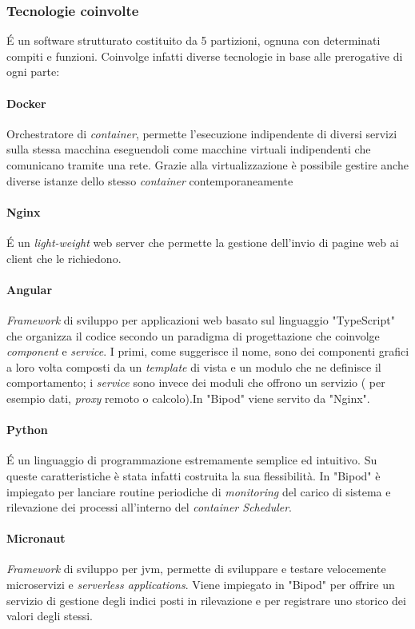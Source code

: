 \subsubsection{Tecnologie coinvolte}
\'E un software strutturato costituito da 5 partizioni, ognuna con determinati compiti e funzioni. Coinvolge infatti diverse tecnologie in base alle prerogative di ogni parte:

\paragraph{Docker} Orchestratore di \textit{container}, permette l'esecuzione indipendente di diversi servizi sulla stessa macchina eseguendoli come macchine virtuali indipendenti che comunicano tramite una rete. Grazie alla virtualizzazione è possibile gestire anche diverse istanze dello stesso \textit{container} contemporaneamente

\paragraph{Nginx} \'E un \textit{light-weight} web server che permette la gestione dell'invio di pagine web ai client che le richiedono.

\paragraph{Angular} \textit{Framework} di sviluppo per applicazioni web basato sul linguaggio "TypeScript" che organizza il codice secondo un paradigma di progettazione che coinvolge \textit{component} e \textit{service}. I primi, come suggerisce il nome, sono dei componenti grafici a loro volta composti da un \textit{template} di vista e un modulo che ne definisce il comportamento; i \textit{service} sono invece dei moduli che offrono un servizio ( per esempio dati, \textit{proxy} remoto o calcolo).In "Bipod" viene servito da "Nginx".

\paragraph{Python} \'E un linguaggio di programmazione estremamente semplice ed intuitivo. Su queste caratteristiche è stata infatti costruita la sua flessibilità. In "Bipod" è impiegato per lanciare routine periodiche di \textit{monitoring} del carico di sistema e rilevazione dei processi all'interno del \textit{container Scheduler}.

\paragraph{Micronaut} \textit{Framework} di sviluppo per \acrshort{jvm}\glsfirstoccur, permette di sviluppare e testare velocemente microservizi e \textit{serverless applications}. Viene impiegato in "Bipod" per offrire un servizio di gestione degli indici posti in rilevazione e per registrare uno storico dei valori degli stessi.

